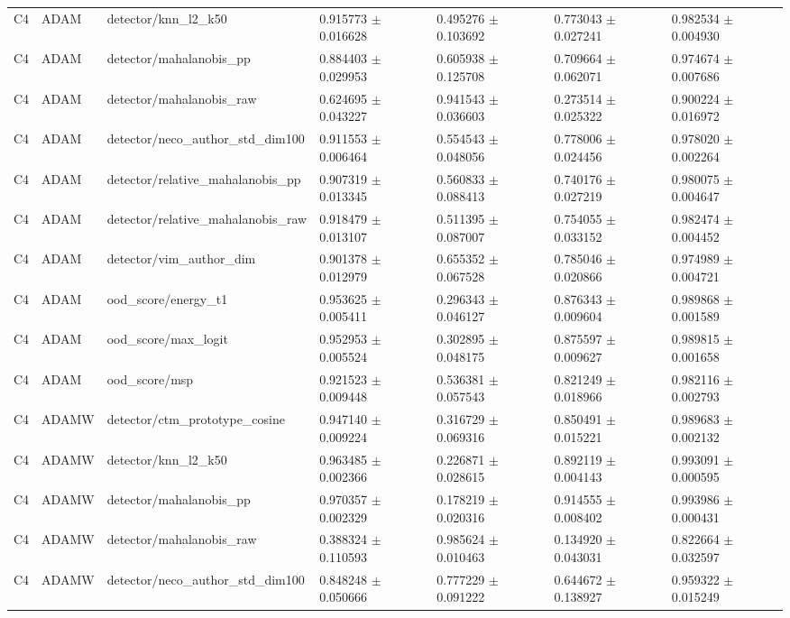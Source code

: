 \begin{longtable}{lllllll}
C4 & ADAM & detector/knn\_l2\_k50 & 0.915773 $\pm$ 0.016628 & 0.495276 $\pm$ 0.103692 & 0.773043 $\pm$ 0.027241 & 0.982534 $\pm$ 0.004930 \\
C4 & ADAM & detector/mahalanobis\_pp & 0.884403 $\pm$ 0.029953 & 0.605938 $\pm$ 0.125708 & 0.709664 $\pm$ 0.062071 & 0.974674 $\pm$ 0.007686 \\
C4 & ADAM & detector/mahalanobis\_raw & 0.624695 $\pm$ 0.043227 & 0.941543 $\pm$ 0.036603 & 0.273514 $\pm$ 0.025322 & 0.900224 $\pm$ 0.016972 \\
C4 & ADAM & detector/neco\_author\_std\_dim100 & 0.911553 $\pm$ 0.006464 & 0.554543 $\pm$ 0.048056 & 0.778006 $\pm$ 0.024456 & 0.978020 $\pm$ 0.002264 \\
C4 & ADAM & detector/relative\_mahalanobis\_pp & 0.907319 $\pm$ 0.013345 & 0.560833 $\pm$ 0.088413 & 0.740176 $\pm$ 0.027219 & 0.980075 $\pm$ 0.004647 \\
C4 & ADAM & detector/relative\_mahalanobis\_raw & 0.918479 $\pm$ 0.013107 & 0.511395 $\pm$ 0.087007 & 0.754055 $\pm$ 0.033152 & 0.982474 $\pm$ 0.004452 \\
C4 & ADAM & detector/vim\_author\_dim & 0.901378 $\pm$ 0.012979 & 0.655352 $\pm$ 0.067528 & 0.785046 $\pm$ 0.020866 & 0.974989 $\pm$ 0.004721 \\
C4 & ADAM & ood\_score/energy\_t1 & 0.953625 $\pm$ 0.005411 & 0.296343 $\pm$ 0.046127 & 0.876343 $\pm$ 0.009604 & 0.989868 $\pm$ 0.001589 \\
C4 & ADAM & ood\_score/max\_logit & 0.952953 $\pm$ 0.005524 & 0.302895 $\pm$ 0.048175 & 0.875597 $\pm$ 0.009627 & 0.989815 $\pm$ 0.001658 \\
C4 & ADAM & ood\_score/msp & 0.921523 $\pm$ 0.009448 & 0.536381 $\pm$ 0.057543 & 0.821249 $\pm$ 0.018966 & 0.982116 $\pm$ 0.002793 \\
C4 & ADAMW & detector/ctm\_prototype\_cosine & 0.947140 $\pm$ 0.009224 & 0.316729 $\pm$ 0.069316 & 0.850491 $\pm$ 0.015221 & 0.989683 $\pm$ 0.002132 \\
C4 & ADAMW & detector/knn\_l2\_k50 & 0.963485 $\pm$ 0.002366 & 0.226871 $\pm$ 0.028615 & 0.892119 $\pm$ 0.004143 & 0.993091 $\pm$ 0.000595 \\
C4 & ADAMW & detector/mahalanobis\_pp & 0.970357 $\pm$ 0.002329 & 0.178219 $\pm$ 0.020316 & 0.914555 $\pm$ 0.008402 & 0.993986 $\pm$ 0.000431 \\
C4 & ADAMW & detector/mahalanobis\_raw & 0.388324 $\pm$ 0.110593 & 0.985624 $\pm$ 0.010463 & 0.134920 $\pm$ 0.043031 & 0.822664 $\pm$ 0.032597 \\
C4 & ADAMW & detector/neco\_author\_std\_dim100 & 0.848248 $\pm$ 0.050666 & 0.777229 $\pm$ 0.091222 & 0.644672 $\pm$ 0.138927 & 0.959322 $\pm$ 0.015249 \\

\end{longtable}
